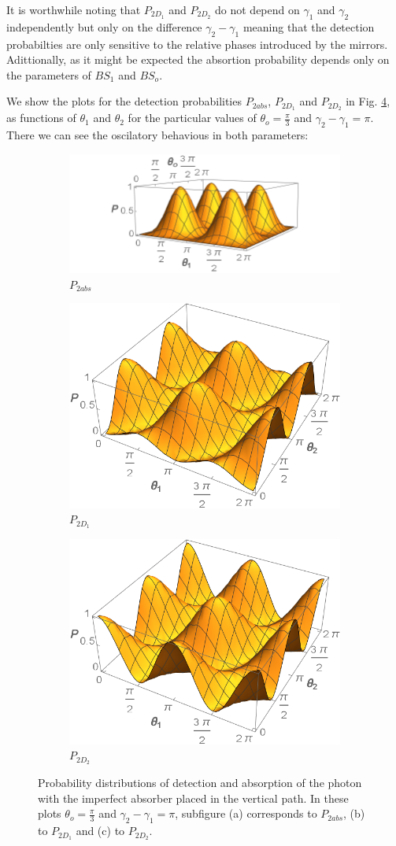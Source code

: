 \documentclass[12pt]{book}
\begin{document}
It is worthwhile noting that $P_{2D_{1}}$ and $P_{2D_{2}}$ do not depend on $\gamma_{1}$ and $\gamma_{2}$ independently but only on the difference $\gamma_{2}-\gamma_{1}$ meaning that the detection probabilties are only sensitive to the relative phases introduced by the mirrors. Adittionally, as it might be expected the absortion probability depends only on the parameters of $BS_{1}$ and $BS_{o}$.

We show the plots for the detection probabilities $P_{2abs}$, $P_{2D_{1}}$ and $P_{2D_{2}}$ in Fig. \ref{P_bs}, as functions of $\theta_{1}$ and $\theta_{2}$ for the particular values of $\theta_{o}=\frac{\pi}{3}$ and $\gamma_{2}-\gamma_{1}=\pi$. There we can see the oscilatory behavious in both parameters:



\begin{figure}[H]
\centering
\begin{subfigure}[b]{0.45\linewidth}
\includegraphics[width=\linewidth,height=2.8 cm]{images/P1abs.png}
\caption{$P_{2abs}$}
\label{fig:BS2}
\end{subfigure}
\begin{subfigure}[b]{0.45\linewidth}
\includegraphics[width=\linewidth,height=2.8 cm]{images/P1d1.png}
\caption{$P_{2D_{1}}$}
\label{fig:westminster_aerea}
\end{subfigure}
\begin{subfigure}[b]{0.45\linewidth}
\includegraphics[width=\linewidth,height=2.8 cm]{images/P1d2.png}
\caption{$P_{2D_{2}}$}
\label{fig:BS2}
\end{subfigure}
\caption{Probability distributions of detection and absorption of the photon with the imperfect absorber placed in the vertical path. In these plots $\theta_{o}=\frac{\pi}{3}$ and $\gamma_{2}-\gamma_{1}=\pi$, subfigure (a) corresponds to $P_{2abs}$, (b) to $P_{2D_{1}}$ and (c) to $P_{2D_{2}}$.}
\label{P_bs}
\end{figure}
\end{document}

